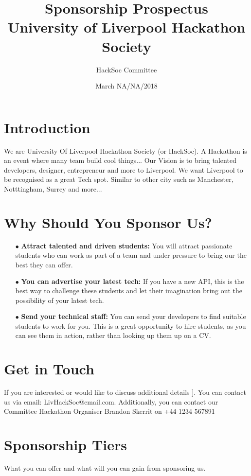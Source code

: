\documentclass{report}
\title{%
      Sponsorship Prospectus \\
      \large University of Liverpool Hackathon Society}
\author{HackSoc Committee}
\date{March NA/NA/2018}
\begin{document}
    \pagecolor{MyMidBlack}
    \color{white}
    
    \maketitle
    
    \section *{Introduction}
    We are University Of Liverpool Hackathon Society (or HackSoc). A Hackathon is an event where many team build cool things... Our Vision is to bring talented developers, designer, entrepreneur and more to Liverpool. We want Liverpool to be recognised as a great Tech spot. Similar to other city such as Manchester, Notttingham, Surrey and more...
    
    
    \section *{Why Should You Sponsor Us?}
    
    \begin{itemize}
        \item[$\bullet$] \textbf{Attract talented and driven students: }You will attract passionate students
        who can work as part of a team and under pressure to bring our the best they can offer.
        \item[$\bullet$] \textbf{You can advertise your latest tech: }If you have a new API, this is the 
        best way to challenge these students and let their imagination bring out the possibility of your latest
        tech.
        \item[$\bullet$] \textbf{Send your technical staff: }You can send your developers to find suitable 
        students to work for you. This is a great opportunity to hire students, as you can see them in action, 
        rather than looking up them up on a CV.
    
    \end{itemize}
     
    
      
    
    \section *{Get in Touch}
    If you are interested or would like to discuss additional details ]. You can contact us via email: \textcolor{MyLinkBlue}{LivHackSoc@email.com}. Additionally, you
    can contact our Committee Hackathon Organiser Brandon Skerrit on \textcolor{MyLinkBlue}{+44 1234 567891}

    \section *{Sponsorship Tiers}
    What you can offer and what will you can gain from sponsoring us.
    
    
\end{document}
